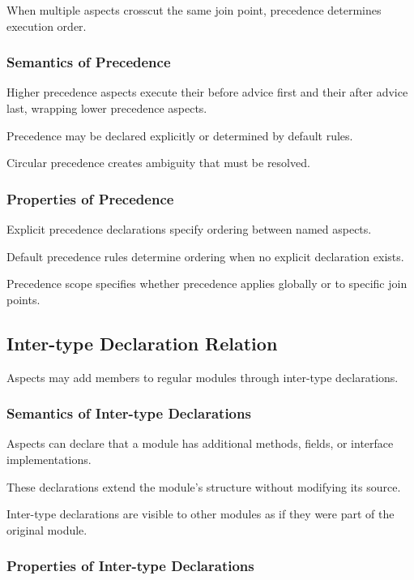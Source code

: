 \documentclass[11pt]{article}
\begin{document}
When multiple aspects crosscut the same join point, precedence determines execution order.

\subsubsection{Semantics of Precedence}

Higher precedence aspects execute their before advice first and their after advice last, wrapping lower precedence aspects.

Precedence may be declared explicitly or determined by default rules.

Circular precedence creates ambiguity that must be resolved.

\subsubsection{Properties of Precedence}

Explicit precedence declarations specify ordering between named aspects.

Default precedence rules determine ordering when no explicit declaration exists.

Precedence scope specifies whether precedence applies globally or to specific join points.

\subsection{Inter-type Declaration Relation}

Aspects may add members to regular modules through inter-type declarations.

\subsubsection{Semantics of Inter-type Declarations}

Aspects can declare that a module has additional methods, fields, or interface implementations.

These declarations extend the module's structure without modifying its source.

Inter-type declarations are visible to other modules as if they were part of the original module.

\subsubsection{Properties of Inter-type Declarations}
\end{document}
